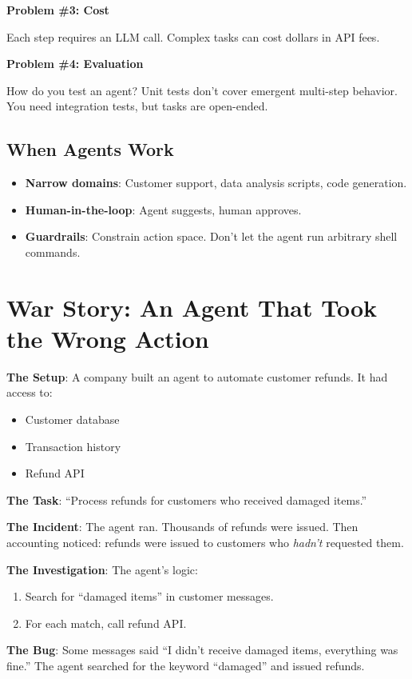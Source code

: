 \documentclass[11pt,oneside]{book}
\begin{document}
\textbf{Problem \#3: Cost}

Each step requires an LLM call. Complex tasks can cost dollars in API fees.

\textbf{Problem \#4: Evaluation}

How do you test an agent? Unit tests don't cover emergent multi-step behavior. You need integration tests, but tasks are open-ended.

\subsection{When Agents Work}

\begin{itemize}
\item \textbf{Narrow domains}: Customer support, data analysis scripts, code generation.
\item \textbf{Human-in-the-loop}: Agent suggests, human approves.
\item \textbf{Guardrails}: Constrain action space. Don't let the agent run arbitrary shell commands.
\end{itemize}

\section{War Story: An Agent That Took the Wrong Action}

\textbf{The Setup}: A company built an agent to automate customer refunds. It had access to:
\begin{itemize}
\item Customer database
\item Transaction history
\item Refund API
\end{itemize}

\textbf{The Task}: ``Process refunds for customers who received damaged items.''

\textbf{The Incident}: The agent ran. Thousands of refunds were issued. Then accounting noticed: refunds were issued to customers who \textit{hadn't} requested them.

\textbf{The Investigation}: The agent's logic:
\begin{enumerate}
\item Search for ``damaged items'' in customer messages.
\item For each match, call refund API.
\end{enumerate}

\textbf{The Bug}: Some messages said ``I didn't receive damaged items, everything was fine.'' The agent searched for the keyword ``damaged'' and issued refunds.
\end{document}
